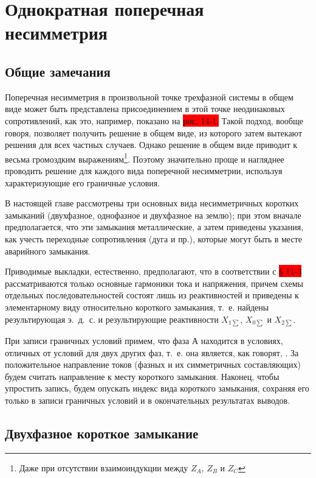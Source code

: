 \chapter{Однократная поперечная несимметрия}
\label{chap:14}

\section{Общие замечания}
\label{sec:14-1}

Поперечная несимметрия в произвольной точке трехфазной системы в общем виде может быть представлена присоединением в этой точке неодинаковых сопротивлений, как это, например, показано на \colorbox{red}{рис. 14-1.} Такой подход, вообще говоря, позволяет получить решение в общем виде, из которого затем вытекают решения для всех частных случаев. Однако решение в общем виде приводит к весьма громоздким выражениям\footnote{Даже при отсутствии взаимоиндукции между $ Z_A $, $ Z_B $ и $ Z_C $}. Поэтому значительно проще и нагляднее проводить решение для каждого вида поперечной несимметрии, используя характеризующие его граничные условия.

В настоящей главе рассмотрены три основных вида несимметричных коротких замыканий (двухфазное, однофазное и двухфазное на землю); при этом вначале предполагается, что эти замыкания металлические, а затем приведены указания, как учесть переходные сопротивления (дуга и пр.), которые могут быть в месте аварийного замыкания.

Приводимые выкладки, естественно, предполагают, что в соответствии с \colorbox{red}{§ 11-3} рассматриваются только основные гармоники тока и напряжения, причем схемы отдельных последовательностей состоят лишь из реактивностей и приведены к элементарному виду относительно короткого замыкания, т.~е. найдены результирующая э.~д.~с. и результирующие реактивности $ X_{1\sum} $, $ X_{0\sum} $ и $ X_{2\sum} $.

При записи граничных условий примем, что фаза А находится в условиях, отличных от условий для двух других фаз, т.~е. она является, как говорят, . За положительное направление токов (фазных и их симметричных составляющих) будем считать направление к месту короткого замыкания. Наконец, чтобы упростить запись, будем опускать индекс вида короткого замыкания, сохраняя его только в записи граничных условий и в окончательных результатах выводов.


\section{Двухфазное короткое замыкание}
\label{sec:14-2}


